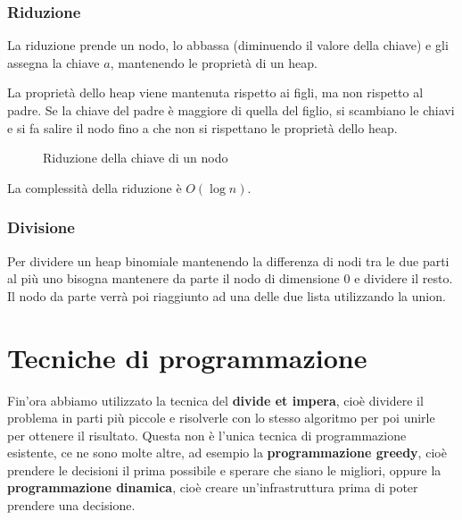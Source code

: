 \documentclass[a4paper]{article}
\begin{document}
\subsubsection{Riduzione}
La riduzione prende un nodo, lo abbassa (diminuendo il valore della chiave) e gli assegna
la chiave \( a \), mantenendo le proprietà di un heap.

La proprietà dello heap viene mantenuta rispetto ai figli, ma non rispetto al padre. Se
la chiave del padre è maggiore di quella del figlio, si scambiano le chiavi e si fa
salire il nodo fino a che non si rispettano le proprietà dello heap.

\begin{figure}[H]
  \centering
  \caption{Riduzione della chiave di un nodo}
\end{figure}

\noindent
La complessità della riduzione è \( O(\log n) \).

\subsubsection{Divisione}
Per dividere un heap binomiale mantenendo la differenza di nodi tra le due parti al più
uno bisogna mantenere da parte il nodo di dimensione 0 e dividere il resto. Il nodo
da parte verrà poi riaggiunto ad una delle due lista utilizzando la union.

\section{Tecniche di programmazione}
Fin'ora abbiamo utilizzato la tecnica del \textbf{divide et impera}, cioè dividere
il problema in parti più piccole e risolverle con lo stesso algoritmo per poi unirle
per ottenere il risultato. Questa non è l'unica tecnica di programmazione esistente,
ce ne sono molte altre, ad esempio la \textbf{programmazione greedy}, cioè prendere
le decisioni il prima possibile e sperare che siano le migliori, oppure la
\textbf{programmazione dinamica}, cioè creare un'infrastruttura prima di poter 
prendere una decisione.
\end{document}
